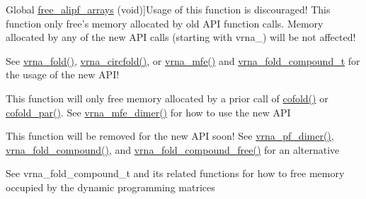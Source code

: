 \begin{DoxyRefList}
\hypertarget{deprecated__deprecated000022}{}%
Global \hyperlink{group__consensus__pf__fold_ga0c0498f35686e26b38ee460d3db1a661}{free\+\_\+alipf\+\_\+arrays} (void)]Usage of this function is discouraged! This function only free's memory allocated by old A\+P\+I function calls. Memory allocated by any of the new A\+P\+I calls (starting with vrna\+\_\+) will be not affected! 
\item[\label{deprecated__deprecated000066}%
\hypertarget{deprecated__deprecated000066}{}%
Global \hyperlink{group__mfe__fold__single_ga107fdfe5fd641868156bfd849f6866c7}{free\+\_\+arrays} (void)]See \hyperlink{group__mfe__fold__single_gae7ca49ffb3086f145da36c964a7cec64}{vrna\+\_\+fold()}, \hyperlink{group__mfe__fold__single_gaa0f5bf321038f404b36a6147bdae4154}{vrna\+\_\+circfold()}, or \hyperlink{group__mfe__fold_gabd3b147371ccf25c577f88bbbaf159fd}{vrna\+\_\+mfe()} and \hyperlink{group__fold__compound_ga1b0cef17fd40466cef5968eaeeff6166}{vrna\+\_\+fold\+\_\+compound\+\_\+t} for the usage of the new A\+P\+I! 
\item[\label{deprecated__deprecated000032}%
\hypertarget{deprecated__deprecated000032}{}%
Global \hyperlink{group__mfe__cofold_gaafb33d7473eb9af9d1b168ca8761c41a}{free\+\_\+co\+\_\+arrays} (void)]This function will only free memory allocated by a prior call of \hyperlink{group__mfe__cofold_gabc8517f22cfe70595ee81fc837910d52}{cofold()} or \hyperlink{group__mfe__cofold_ga7612cfeeb1b793f1e4179b1eb53df1f3}{cofold\+\_\+par()}. See \hyperlink{group__mfe__cofold_gaab22d10c1190f205f16a77cab9d5d3ee}{vrna\+\_\+mfe\+\_\+dimer()} for how to use the new A\+P\+I 
\item[\label{deprecated__deprecated000116}%
\hypertarget{deprecated__deprecated000116}{}%
Global \hyperlink{part__func__co_8h_ade3ce34ae8214811374b1d28a40dc247}{free\+\_\+co\+\_\+pf\+\_\+arrays} (void)]This function will be removed for the new A\+P\+I soon! See \hyperlink{group__pf__cofold_ga4e5c7d06c302a7c59fc0d64dc142ca63}{vrna\+\_\+pf\+\_\+dimer()}, \hyperlink{group__fold__compound_ga6601d994ba32b11511b36f68b08403be}{vrna\+\_\+fold\+\_\+compound()}, and \hyperlink{group__fold__compound_gadded6039d63f5d6509836e20321534ad}{vrna\+\_\+fold\+\_\+compound\+\_\+free()} for an alternative  
\item[\label{deprecated__deprecated000097}%
\hypertarget{deprecated__deprecated000097}{}%
Global \hyperlink{group__pf__fold_gae73db3f49a94f0f72e067ecd12681dbd}{free\+\_\+pf\+\_\+arrays} (void)]See vrna\+\_\+fold\+\_\+compound\+\_\+t and its related functions for how to free memory occupied by the dynamic programming matrices 

\end{DoxyRefList}
